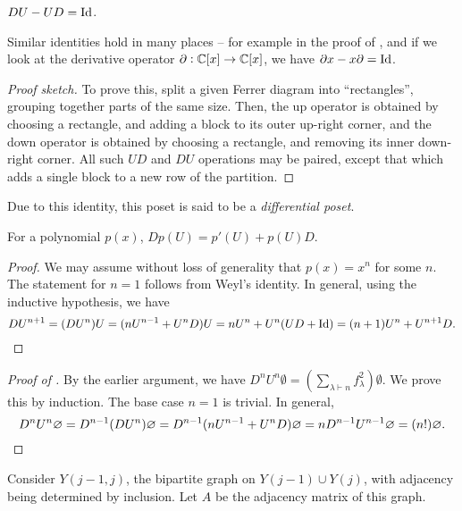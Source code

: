 \begin{flem}
	$DU - UD = \Id$.
\end{flem}
Similar identities hold in many places -- for example in the proof of , and if we look at the derivative operator $\partial : \C[x] \to \C[x]$, we have $\partial x - x \partial = \Id$.
\begin{proof}[Proof sketch]
	To prove this, split a given Ferrer diagram into ``rectangles'', grouping together parts of the same size. Then, the up operator is obtained by choosing a rectangle, and adding a block to its outer up-right corner, and the down operator is obtained by choosing a rectangle, and removing its inner down-right corner. All such $UD$ and $DU$ operations may be paired, except that which adds a single block to a new row of the partition.
\end{proof}

Due to this identity, this poset is said to be a \emph{differential poset}.
\begin{fcor}
	For a polynomial $p(x)$, $Dp(U) = p'(U) + p(U)D$.
\end{fcor}
\begin{proof}
	We may assume without loss of generality that $p(x) = x^n$ for some $n$. The statement for $n=1$ follows from Weyl's identity. In general, using the inductive hypothesis, we have
	\[ DU^{n+1} = (DU^n)U = (nU^{n-1} + U^nD)U = nU^{n} + U^n(UD+\Id) = (n+1)U^n + U^{n+1}D. \]
\end{proof}

\begin{proof}[Proof of ]
	By the earlier argument, we have $D^nU^n \emptyset = \left(\sum_{\lambda \vdash n} f_\lambda^2\right) \emptyset$. We prove this by induction. The base case $n=1$ is trivial. In general,
	\[ D^nU^n \emptyset = D^{n-1}(DU^n) \emptyset = D^{n-1}(nU^{n-1} + U^nD)\emptyset = n D^{n-1}U^{n-1} \emptyset = (n!) \emptyset. \qedhere \]
\end{proof}

Consider $Y(j-1,j)$, the bipartite graph on $Y(j-1) \cup Y(j)$, with adjacency being determined by inclusion. Let $A$ be the adjacency matrix of this graph.


